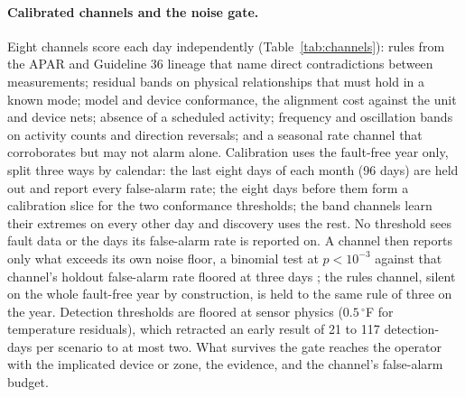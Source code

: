 \documentclass[11pt,letterpaper]{article}
\begin{document}
\paragraph{Calibrated channels and the noise gate.} Eight channels score each day independently (Table~\ref{tab:channels}): rules from the APAR and Guideline 36 lineage \cite{schein2006apar} that name direct contradictions between measurements; residual bands on physical relationships that must hold in a known mode; model and device conformance, the alignment cost \cite{vanderaalst2012replaying} against the unit and device nets; absence of a scheduled activity; frequency and oscillation bands on activity counts and direction reversals; and a seasonal rate channel that corroborates but may not alarm alone. Calibration uses the fault-free year only, split three ways by calendar: the last eight days of each month (96 days) are held out and report every false-alarm rate; the eight days before them form a calibration slice for the two conformance thresholds; the band channels learn their extremes on every other day and discovery uses the rest. No threshold sees fault data or the days its false-alarm rate is reported on. A channel then reports only what exceeds its own noise floor, a binomial test at $p<10^{-3}$ against that channel's holdout false-alarm rate floored at three days \cite{hanley1983zeronumerators}; the rules channel, silent on the whole fault-free year by construction, is held to the same rule of three on the year. Detection thresholds are floored at sensor physics ($0.5\,^\circ$F for temperature residuals), which retracted an early result of 21 to 117 detection-days per scenario to at most two. What survives the gate reaches the operator with the implicated device or zone, the evidence, and the channel's false-alarm budget.
\end{document}
